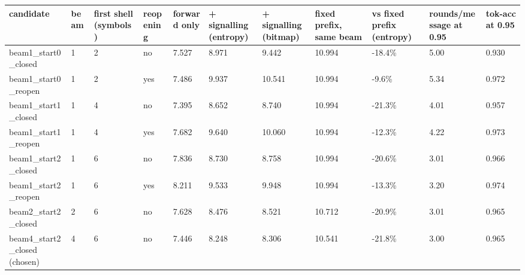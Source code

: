 \begin{tabular}{lllllllllll}
\hline
candidate & beam & first shell (symbols) & reopening & forward only & + signalling (entropy) & + signalling (bitmap) & fixed prefix, same beam & vs fixed prefix (entropy) & rounds/message at 0.95 & tok-acc at 0.95 \\
\hline
beam1\_start0\_closed & 1 & 2 & no & 7.527 & 8.971 & 9.442 & 10.994 & -18.4\% & 5.00 & 0.930 \\
beam1\_start0\_reopen & 1 & 2 & yes & 7.486 & 9.937 & 10.541 & 10.994 & -9.6\% & 5.34 & 0.972 \\
beam1\_start1\_closed & 1 & 4 & no & 7.395 & 8.652 & 8.740 & 10.994 & -21.3\% & 4.01 & 0.957 \\
beam1\_start1\_reopen & 1 & 4 & yes & 7.682 & 9.640 & 10.060 & 10.994 & -12.3\% & 4.22 & 0.973 \\
beam1\_start2\_closed & 1 & 6 & no & 7.836 & 8.730 & 8.758 & 10.994 & -20.6\% & 3.01 & 0.966 \\
beam1\_start2\_reopen & 1 & 6 & yes & 8.211 & 9.533 & 9.948 & 10.994 & -13.3\% & 3.20 & 0.974 \\
beam2\_start2\_closed & 2 & 6 & no & 7.628 & 8.476 & 8.521 & 10.712 & -20.9\% & 3.01 & 0.965 \\
beam4\_start2\_closed (chosen) & 4 & 6 & no & 7.446 & 8.248 & 8.306 & 10.541 & -21.8\% & 3.00 & 0.965 \\
\hline
\end{tabular}
